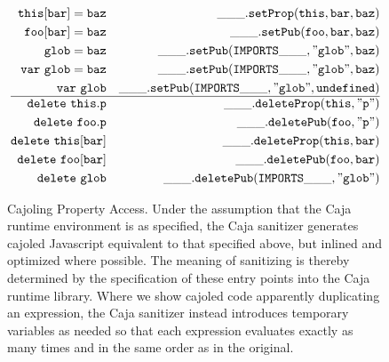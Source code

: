 \documentclass[letterpaper,twocolumn,10pt]{article}
\newcommand{\code}[1]{{\tt {#1}}}              %
\begin{document}
\begin{figure}
\begin{eqnarray}
  \code{this[bar] = baz}    & \label{set:index-internal} & \code{\_\_\_.setProp(this,bar,baz)} \\
  \code{foo[bar] = baz}     & \label{set:index-public}  & \code{\_\_\_.setPub(foo,bar,baz)} \\
  \code{glob = baz}         & \label{set:global}        & \code{\_\_\_.setPub(IMPORTS\_\_\_,"glob",baz)} \\
  \code{var\ glob = baz}    & \label{set:global-init}   & \code{\_\_\_.setPub(IMPORTS\_\_\_,"glob",baz)} \\
  \code{var\ glob}          & \label{set:global-decl}   & \code{\_\_\_.setPub(IMPORTS\_\_\_,"glob",undefined)}\\
  \hline
  \code{delete\ this.p}     & \label{delete-internal}   & \code{\_\_\_.deleteProp(this,"p")} \\
  \code{delete\ foo.p}      & \label{delete:public}     & \code{\_\_\_.deletePub(foo,"p")} \\
  \code{delete\ this[bar]}  & \label{delete:index-internal} & \code{\_\_\_.deleteProp(this,bar)} \\
 \code{delete\ foo[bar]}    & \label{delete:index-public}   & \code{\_\_\_.deletePub(foo,bar)} \\
  \code{delete\ glob}       & \label{delete:global}   & \code{\_\_\_.deletePub(IMPORTS\_\_\_,"glob")}
\end{eqnarray}

\caption[Cajoling Property Access]{Cajoling Property Access. Under the 
assumption that the Caja runtime environment is as specified, the Caja 
sanitizer generates cajoled Javascript equivalent to that specified above, 
but inlined and optimized where possible. The meaning of sanitizing is 
thereby determined by the specification of these entry points into the Caja 
runtime library. Where we show cajoled code apparently duplicating an 
expression, the Caja sanitizer instead introduces temporary variables as 
needed so that each expression evaluates exactly as many times and in the 
same order as in the original.}
\label{tab:prop-xlate}
\end{figure}
\end{document}
